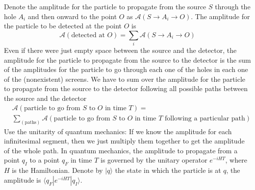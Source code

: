 \documentclass[11pt,a4paper]{article}
\begin{document}
Denote the amplitude for the particle to propagate from the source $S$ through the hole $A_i$ and then onward to the point $O$ as $\mathcal A(S \rightarrow A_i \rightarrow O)$. The amplitude for the particle to be detected at the point $O$ is
\begin{equation}
\mathcal A (\text{detected at } O) = \sum_i \mathcal A(S \rightarrow A_i \rightarrow O)
\end{equation}
Even if there were just empty space between the source and the detector, the amplitude for the particle to propagate from the source to the detector is the sum of the amplitudes for the particle to go through each one of the holes in each one of the (nonexistent) screens. We have to sum over the amplitude for the particle to propagate from the source to the detector following all possible paths between the source and the detector
\begin{align}
\nonumber & \mathcal A(\text{particle to go from $S$ to $O$ in time $T$}) = \\
& \sum_{(\text{paths})} \mathcal A(\text{particle to go from $S$ to $O$ in time $T$ following a particular path})
\end{align}
Use the unitarity of quantum mechanics: If we know the amplitude for each infinitesimal segment, then we just multiply them together to get the amplitude of the whole path. In quantum mechanics, the amplitude to propagate from a point $q_I$ to a point $q_F$ in time $T$ is governed by the unitary operator $e^{-iHT}$, where $H$ is the Hamiltonian. Denote by $ |q\rangle$ the state in which the particle is at $q$, the amplitude is $\langle q_F |e^{-iHT}| q_I\rangle$.
\end{document}
